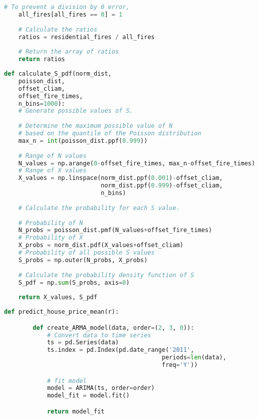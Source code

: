\documentclass[12pt]{article}  %
\begin{document}
\begin{subappendices}
\begin{lstlisting}[language=Python, name={simulate_fire_ratio}]
    # To prevent a division by 0 error, 
    all_fires[all_fires == 0] = 1
    
    # Calculate the ratios
    ratios = residential_fires / all_fires
    
    # Return the array of ratios
    return ratios
\end{lstlisting}

\begin{lstlisting}[language=Python, name={calculate_S_pdf}]
    def calculate_S_pdf(norm_dist, 
    poisson_dist, 
    offset_cliam, 
    offset_fire_times, 
    n_bins=1000):
    # Generate possible values of S. 
    
    # Determine the maximum possible value of N 
    # based on the quantile of the Poisson distribution    
    max_n = int(poisson_dist.ppf(0.999))  
    
    # Range of N values
    N_values = np.arange(0-offset_fire_times, max_n-offset_fire_times)  
    # Range of X values
    X_values = np.linspace(norm_dist.ppf(0.001)-offset_cliam, 
                           norm_dist.ppf(0.999)-offset_cliam, 
                           n_bins)  
    
    # Calculate the probability for each S value.
    
    # Probability of N
    N_probs = poisson_dist.pmf(N_values+offset_fire_times)  
    # Probability of X
    X_probs = norm_dist.pdf(X_values+offset_cliam)  
    # Probability of all possible S values
    S_probs = np.outer(N_probs, X_probs)  
    
    # Calculate the probability density function of S
    S_pdf = np.sum(S_probs, axis=0)
    
    return X_values, S_pdf
\end{lstlisting}

\begin{lstlisting}[language=Python, name={predict_house_price_mean}]
    def predict_house_price_mean(r):

        def create_ARMA_model(data, order=(2, 3, 0)):
            # Convert data to time series
            ts = pd.Series(data)
            ts.index = pd.Index(pd.date_range('2011', 
                                            periods=len(data), 
                                            freq='Y'))

            # fit model
            model = ARIMA(ts, order=order)
            model_fit = model.fit()

            return model_fit


\end{lstlisting}
\end{subappendices}
\end{document}
